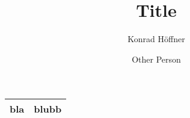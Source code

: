 \documentclass[a4paper]{article}
\author{Konrad Höffner \and Other Person}
\title{Title}
\begin{document}
\maketitle

\begin{tabulary}{\textwidth}{ll}
\toprule
bla	&blubb\\
\bottomrule
\end{tabulary}

%
%
\end{document}
